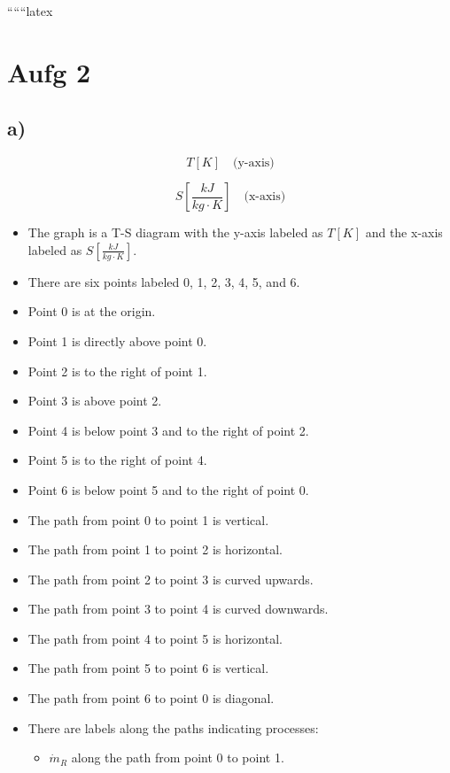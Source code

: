 
``````latex


\section*{Aufg 2}

\subsection*{a)}

\[
T [K] \quad \text{(y-axis)}
\]

\[
S \left[ \frac{kJ}{kg \cdot K} \right] \quad \text{(x-axis)}
\]

\begin{itemize}
    \item The graph is a T-S diagram with the y-axis labeled as \( T [K] \) and the x-axis labeled as \( S \left[ \frac{kJ}{kg \cdot K} \right] \).
    \item There are six points labeled 0, 1, 2, 3, 4, 5, and 6.
    \item Point 0 is at the origin.
    \item Point 1 is directly above point 0.
    \item Point 2 is to the right of point 1.
    \item Point 3 is above point 2.
    \item Point 4 is below point 3 and to the right of point 2.
    \item Point 5 is to the right of point 4.
    \item Point 6 is below point 5 and to the right of point 0.
    \item The path from point 0 to point 1 is vertical.
    \item The path from point 1 to point 2 is horizontal.
    \item The path from point 2 to point 3 is curved upwards.
    \item The path from point 3 to point 4 is curved downwards.
    \item The path from point 4 to point 5 is horizontal.
    \item The path from point 5 to point 6 is vertical.
    \item The path from point 6 to point 0 is diagonal.
    \item There are labels along the paths indicating processes:
        \begin{itemize}
            \item \( \dot{m}_R \) along the path from point 0 to point 1.

\end{itemize}
\end{itemize}
